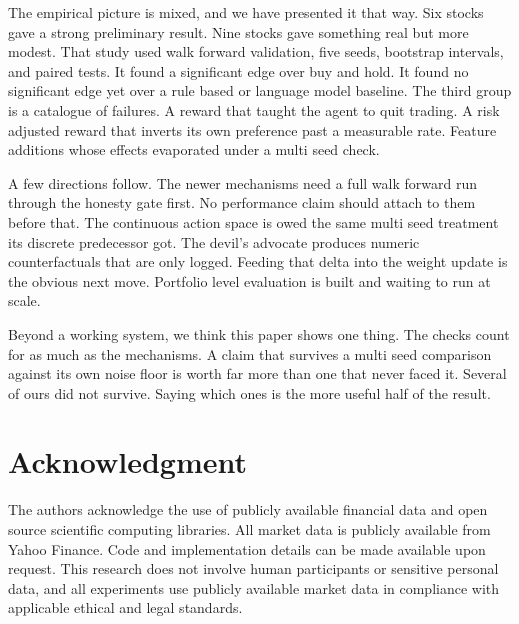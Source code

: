 \documentclass[conference]{IEEEtran}
\begin{document}
The empirical picture is mixed, and we have presented it that way. Six stocks gave a strong preliminary result. Nine stocks gave something real but more modest. That study used walk forward validation, five seeds, bootstrap intervals, and paired tests. It found a significant edge over buy and hold. It found no significant edge yet over a rule based or language model baseline. The third group is a catalogue of failures. A reward that taught the agent to quit trading. A risk adjusted reward that inverts its own preference past a measurable rate. Feature additions whose effects evaporated under a multi seed check.

A few directions follow. The newer mechanisms need a full walk forward run through the honesty gate first. No performance claim should attach to them before that. The continuous action space is owed the same multi seed treatment its discrete predecessor got. The devil's advocate produces numeric counterfactuals that are only logged. Feeding that delta into the weight update is the obvious next move. Portfolio level evaluation is built and waiting to run at scale.

Beyond a working system, we think this paper shows one thing. The checks count for as much as the mechanisms. A claim that survives a multi seed comparison against its own noise floor is worth far more than one that never faced it. Several of ours did not survive. Saying which ones is the more useful half of the result.

\section*{Acknowledgment}
The authors acknowledge the use of publicly available financial data and open source scientific computing libraries. All market data is publicly available from Yahoo Finance. Code and implementation details can be made available upon request. This research does not involve human participants or sensitive personal data, and all experiments use publicly available market data in compliance with applicable ethical and legal standards.



\end{document}
